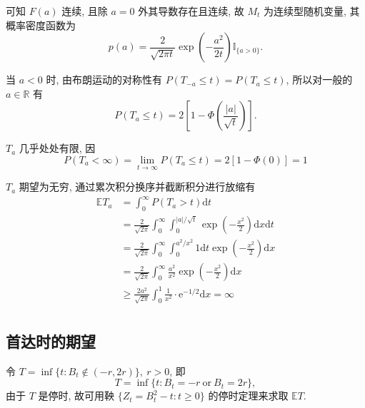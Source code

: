\documentclass[openany]{ctexbook}
\theoremstyle{kaiti}
\theoremstyle{normal}
\begin{document}
可知 $F(a)$ 连续, 且除 $a=0$ 外其导数存在且连续, 故 $M_t$ 为连续型随机变量, 其概率密度函数为
\begin{equation}
  p(a)=\frac{2}{\sqrt{2\pi t}}\exp\left(-\frac{a^2}{2t}\right)\mathbb{I}_{\{a>0\}}.
\end{equation}

当 $a<0$ 时, 由布朗运动的对称性有 $P(T_{-a}\leqslant t)=P(T_a\leqslant t)$, 所以对一般的 $a\in\mathbb{R}$ 有
\begin{equation}
  P(T_a\leqslant t)=2\left[1-\Phi\left(\frac{|a|}{\sqrt{t}}\right)\right].
\end{equation}

$T_a$ 几乎处处有限, 因
\begin{equation}
  P(T_a<\infty)=\lim_{t\to\infty}P(T_a\leqslant t)=2[1-\Phi(0)]=1
\end{equation}

$T_a$ 期望为无穷, 通过累次积分换序并截断积分进行放缩有
\begin{equation}
  \begin{aligned}
    \mathbb{E}T_a
    &=\int_0^\infty P(T_a>t)\mathrm{d}t\\
    &=\frac{2}{\sqrt{2\pi}}\int_0^\infty \int_0^{|a|/\sqrt{t}}\exp\left(-\frac{x^2}{2}\right)\mathrm{d}x\mathrm{d}t\\
    &=\frac{2}{\sqrt{2\pi}}\int_0^\infty \int_0^{a^2/x^2}1\mathrm{d}t\exp\left(-\frac{x^2}{2}\right)\mathrm{d}x\\
    &=\frac{2}{\sqrt{2\pi}}\int_0^\infty \frac{a^2}{x^2}\exp\left(-\frac{x^2}{2}\right)\mathrm{d}x\\
    &\geqslant\frac{2a^2}{\sqrt{2\pi}}\int_0^1\frac{1}{x^2}\cdot\mathrm{e}^{-1/2}\mathrm{d}x=\infty\\
  \end{aligned}
\end{equation}

\subsection{首达时的期望}
令 $T=\inf\{t:B_t\notin(-r,2r)\},~r>0$, 即
\begin{equation}
  T=\inf\{t:B_t=-r~\text{or}~B_t=2r\},
\end{equation}
 由于 $T$ 是停时, 故可用鞅 $\{Z_t=B_t^2-t:t\geqslant0\}$ 的停时定理来求取 $\mathbb{E}T$.
\end{document}
